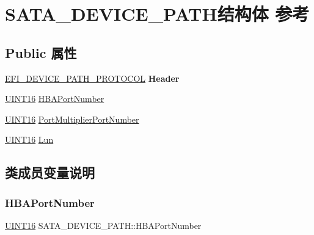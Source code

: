 \hypertarget{struct_s_a_t_a___d_e_v_i_c_e___p_a_t_h}{}\section{S\+A\+T\+A\+\_\+\+D\+E\+V\+I\+C\+E\+\_\+\+P\+A\+T\+H结构体 参考}
\label{struct_s_a_t_a___d_e_v_i_c_e___p_a_t_h}
\subsection*{Public 属性}
\begin{DoxyCompactItemize}
\item 
\mbox{\label{struct_s_a_t_a___d_e_v_i_c_e___p_a_t_h_a9987af7a854df7abddac274ba7c01406}} 
\hyperlink{struct_e_f_i___d_e_v_i_c_e___p_a_t_h___p_r_o_t_o_c_o_l}{E\+F\+I\+\_\+\+D\+E\+V\+I\+C\+E\+\_\+\+P\+A\+T\+H\+\_\+\+P\+R\+O\+T\+O\+C\+OL} {\bfseries Header}
\item 
\hyperlink{_processor_bind_8h_a09f1a1fb2293e33483cc8d44aefb1eb1}{U\+I\+N\+T16} \hyperlink{struct_s_a_t_a___d_e_v_i_c_e___p_a_t_h_ae218dfca50c0ee5eb6f0defc828b6e66}{H\+B\+A\+Port\+Number}
\item 
\hyperlink{_processor_bind_8h_a09f1a1fb2293e33483cc8d44aefb1eb1}{U\+I\+N\+T16} \hyperlink{struct_s_a_t_a___d_e_v_i_c_e___p_a_t_h_a78f920246259896f492f169d67ea48bd}{Port\+Multiplier\+Port\+Number}
\item 
\hyperlink{_processor_bind_8h_a09f1a1fb2293e33483cc8d44aefb1eb1}{U\+I\+N\+T16} \hyperlink{struct_s_a_t_a___d_e_v_i_c_e___p_a_t_h_ae702659141f194a79afa54d4afd054a1}{Lun}
\end{DoxyCompactItemize}


\subsection{类成员变量说明}
\mbox{\label{struct_s_a_t_a___d_e_v_i_c_e___p_a_t_h_ae218dfca50c0ee5eb6f0defc828b6e66}} 
\subsubsection{\texorpdfstring{H\+B\+A\+Port\+Number}{HBAPortNumber}}
{\footnotesize\ttfamily \hyperlink{_processor_bind_8h_a09f1a1fb2293e33483cc8d44aefb1eb1}{U\+I\+N\+T16} S\+A\+T\+A\+\_\+\+D\+E\+V\+I\+C\+E\+\_\+\+P\+A\+T\+H\+::\+H\+B\+A\+Port\+Number}

